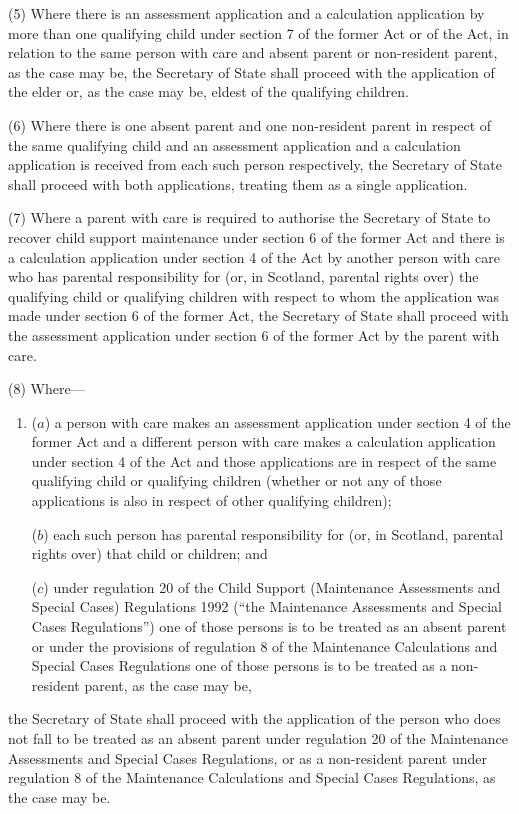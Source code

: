 \documentclass[12pt,a4paper]{article}
\begin{document}
(5) Where there is an assessment application and a calculation application by more than one qualifying child under section 7 of the former Act or of the Act, in relation to the same person with care and absent parent or non-resident parent, as the case may be, the Secretary of State shall proceed with the application of the elder or, as the case may be, eldest of the qualifying children.

(6) Where there is one absent parent and one non-resident parent in respect of the same qualifying child and an assessment application and a calculation application is received from each such person respectively, the Secretary of State shall proceed with both applications, treating them as a single application.

(7) Where a parent with care is required to authorise the Secretary of State to recover child support maintenance under section 6 of the former Act and there is a calculation application under section 4 of the Act by another person with care who has parental responsibility for (or, in Scotland, parental rights over) the qualifying child or qualifying children with respect to whom the application was made under section 6 of the former Act, the Secretary of State shall proceed with the assessment application under section 6 of the former Act by the parent with care.

(8) Where—
\begin{enumerate}\item[]
($a$) a person with care makes an assessment application under section 4 of the former Act and a different person with care makes a calculation application under section 4 of the Act and those applications are in respect of the same qualifying child or qualifying children (whether or not any of those applications is also in respect of other qualifying children);

($b$) each such person has parental responsibility for (or, in Scotland, parental rights over) that child or children; and

($c$) under regulation 20 of the Child Support (Maintenance Assessments and Special Cases) Regulations 1992 (“the Maintenance Assessments and Special Cases Regulations”) one of those persons is to be treated as an absent parent or under the provisions of regulation 8 of the Maintenance Calculations and Special Cases Regulations one of those persons is to be treated as a non-resident parent, as the case may be,
\end{enumerate}
the Secretary of State shall proceed with the application of the person who does not fall to be treated as an absent parent under regulation 20 of the Maintenance Assessments and Special Cases Regulations, or as a non-resident parent under regulation 8 of the Maintenance Calculations and Special Cases Regulations, as the case may be.
\end{document}
